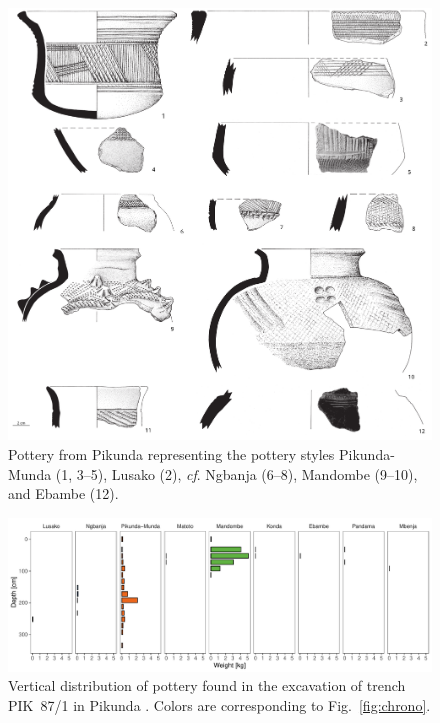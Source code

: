 \documentclass[a4paper]{article}
\begin{document}
\begin{figure}[p]
	\includegraphics[width=\textwidth]{Fig_Pikunda_PotterySampled.pdf}
	\caption{Pottery from Pikunda representing the pottery styles Pikunda-Munda (1, 3--5), Lusako (2), \textit{cf}. Ngbanja (6--8), Mandombe (9--10), and Ebambe (12).}
	\label{fig:pik.pottery}
\end{figure}

\begin{figure}[p]
	\includegraphics[width=\textwidth]{Fig_PIK87-1_Po_Wgt.pdf}
	\caption{Vertical distribution of pottery found in the excavation of trench PIK~87/1 in Pikunda \citep[cf.][293 Fig.~135.D]{Seidensticker.2021e}. Colors are corresponding to Fig.~\ref{fig:chrono}.}
	\label{fig:pik87_1.pottery}
\end{figure}
\end{document}
